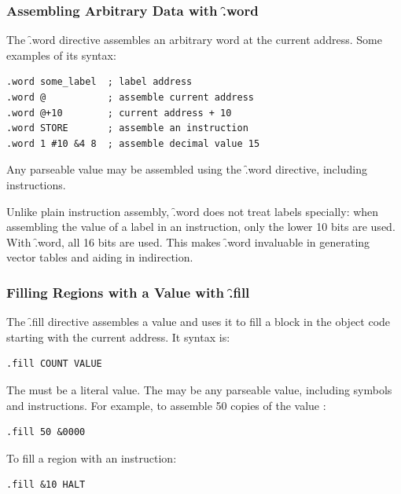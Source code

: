 \subsubsection{Assembling Arbitrary Data with \f{.word}}

The \f{.word} directive assembles an arbitrary word at the current
address. Some examples of its syntax:

\begin{lstlisting}[language=cftasm]
.word some_label  ; label address
.word @           ; assemble current address
.word @+10        ; current address + 10
.word STORE       ; assemble an instruction
.word 1 #10 &4 8  ; assemble decimal value 15
\end{lstlisting}

Any parseable value may be assembled using the \f{.word} directive, including
instructions.

Unlike plain instruction assembly, \f{.word} does not treat labels specially:
when assembling the value of a label in an instruction, only the lower 10 bits
are used. With \f{.word}, all 16 bits are used. This makes \f{.word} invaluable
in generating vector tables and aiding in indirection.



\subsubsection{Filling Regions with a Value with \f{.fill}}

The \f{.fill} directive assembles a value and uses it to fill a block in the
object code starting with the current address. It syntax is:

\begin{lstlisting}[language=cftasm,numbers=none]
.fill COUNT VALUE
\end{lstlisting}

The  must be a literal value. The  may be any parseable
value, including symbols and instructions. For example, to assemble 50 copies
of the value :

\begin{lstlisting}[language=cftasm,numbers=none]
.fill 50 &0000
\end{lstlisting}

To fill a region with an instruction:

\begin{lstlisting}[language=cftasm,numbers=none]
.fill &10 HALT
\end{lstlisting}

